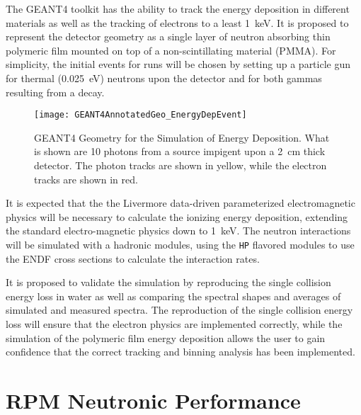 The GEANT4 toolkit has the ability to track the energy deposition in different materials as well as the tracking of electrons to a least \SI{1}{\keV}\cite{agostinelli_geant4simulation_2003}.
It is proposed to represent the detector geometry as a single layer of neutron absorbing thin polymeric film mounted on top of a non-scintillating material (PMMA).
For simplicity, the initial events for runs will be chosen by setting up a particle gun for thermal (\SI{0.025}{\eV}) neutrons upon the detector and for both gammas resulting from a  decay.
\begin{figure}
  \texttt{[image: GEANT4AnnotatedGeo\_EnergyDepEvent]}
	\caption[GEANT4 Energy Depostion Geometry]{GEANT4 Geometry for the Simulation of Energy Deposition. What is shown are 10 photons from a  source impigent upon a \SI{2}{\cm} thick detector.  The photon tracks are shown in yellow, while the electron tracks are shown in red.}
	\label{fig:EDepSimGeo}
\end{figure}
It is expected that the the Livermore data-driven parameterized electromagnetic physics will be necessary to calculate the ionizing energy deposition, extending the standard electro-magnetic physics down to \SI{1}{\kilo\eV}.
The neutron interactions will be simulated with a hadronic modules, using the \verb+HP+ flavored modules to use the ENDF cross sections to calculate the interaction rates.

It is proposed to validate the simulation by reproducing the single collision energy loss in water as well as comparing  the spectral shapes and averages of simulated and measured spectra.
The reproduction of the single collision energy loss will ensure that the electron physics are implemented correctly, while the simulation of the polymeric film energy deposition allows the user to gain confidence that the correct tracking and binning analysis has been implemented.
\section{RPM Neutronic Performance}
\label{sec:RPMNP}

